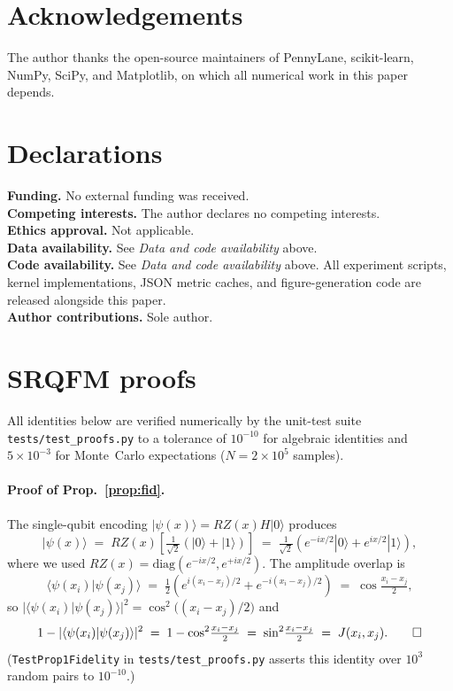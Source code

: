 \documentclass[pdflatex,sn-mathphys-num]{sn-jnl}
\theoremstyle{thmstyleone}
\theoremstyle{thmstyletwo}
\theoremstyle{thmstylethree}
\begin{document}
\section*{Acknowledgements}
The author thanks the open-source maintainers of PennyLane,
scikit-learn, NumPy, SciPy, and Matplotlib, on which all numerical
work in this paper depends.

\section*{Declarations}
\textbf{Funding.} No external funding was received.\\
\textbf{Competing interests.} The author declares no competing interests.\\
\textbf{Ethics approval.} Not applicable.\\
\textbf{Data availability.} See \emph{Data and code availability}
above.\\
\textbf{Code availability.} See \emph{Data and code availability}
above. All experiment scripts, kernel implementations, JSON metric
caches, and figure-generation code are released alongside this paper.\\
\textbf{Author contributions.} Sole author.

\appendix

\section{SRQFM proofs}\label{appx:srqfm}
All identities below are verified numerically by the unit-test suite
\texttt{tests/test\_proofs.py} to a tolerance of $10^{-10}$ for
algebraic identities and $5\times 10^{-3}$ for Monte~Carlo expectations
($N=2\times 10^{5}$ samples).

\paragraph{Proof of Prop.~\ref{prop:fid}.}
The single-qubit encoding $|\psi(x)\rangle = RZ(x)H|0\rangle$ produces
\[
|\psi(x)\rangle
\;=\; RZ(x)\!\left[\tfrac{1}{\sqrt2}(|0\rangle + |1\rangle)\right]
\;=\; \tfrac{1}{\sqrt2}\!\left(e^{-ix/2}|0\rangle + e^{ix/2}|1\rangle\right),
\]
where we used $RZ(x) = \mathrm{diag}(e^{-ix/2}, e^{+ix/2})$.
The amplitude overlap is
\[
\langle\psi(x_i)|\psi(x_j)\rangle
\;=\; \tfrac12\!\left(e^{i(x_i-x_j)/2} + e^{-i(x_i-x_j)/2}\right)
\;=\; \cos\!\tfrac{x_i-x_j}{2},
\]
so $|\langle\psi(x_i)|\psi(x_j)\rangle|^2 = \cos^2\!\bigl((x_i-x_j)/2\bigr)$
and
\[
1 - |\langle\psi(x_i)|\psi(x_j)\rangle|^2
\;=\; 1 - \cos^2\!\tfrac{x_i-x_j}{2}
\;=\; \sin^2\!\tfrac{x_i-x_j}{2}
\;=\; J(x_i, x_j). \qed
\]
\noindent (\texttt{TestProp1Fidelity} in
\texttt{tests/test\_proofs.py} asserts this identity over $10^{3}$
random pairs to $10^{-10}$.)
\end{document}
